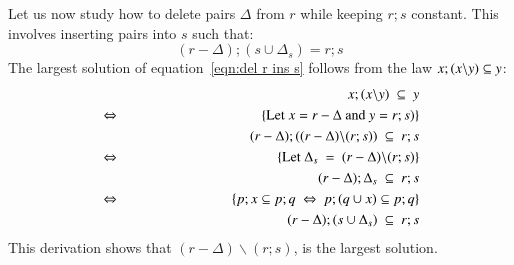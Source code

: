 \documentclass{elsarticle}
\begin{document}
	Let us now study how to delete pairs $\Delta$ from $r$ while keeping $r;s$ constant.
	This involves inserting pairs into $s$ such that:
\begin{equation}
(r-\Delta);(s\cup\Delta_s)=r;s\label{eqn:del r ins s}
\end{equation}
	The largest solution of equation~\ref{eqn:del r ins s} follows from the law $x;(x\backslash y)\subseteq y$:
\begin{eqnarray}
&&x;(x\backslash y)\ \subs\ y\nonumber\\
&\Leftrightarrow&\hspace{1in}\{\text{Let }x=r-\Delta\text{ and }y=r;s)\}\nonumber\\
&&(r-\Delta);((r-\Delta)\backslash(r;s))\ \subs\ r;s\nonumber\\
&\Leftrightarrow&\hspace{1in}\{\text{Let }\Delta_s\ =\ (r-\Delta)\backslash(r;s)\}\nonumber\\
&&(r-\Delta);\Delta_s\ \subs\ r;s\nonumber\\
&\Leftrightarrow&\hspace{1in}\{p;x\subs p;q\ \Leftrightarrow\ p;(q\cup x)\subs p;q\}\nonumber\\
&&(r-\Delta);(s\cup\Delta_s)\ \subs\ r;s\nonumber
\end{eqnarray}
	This derivation shows that $(r-\Delta)\backslash(r;s)$, is the largest solution.
\end{document}
